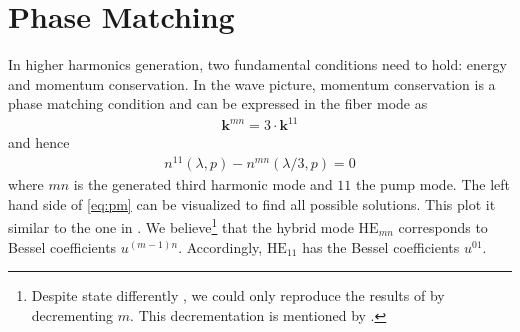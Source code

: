 \documentclass[fleqn, 10pt, twocolumn]{SelfArx}
\begin{document}
    \section{Phase Matching}
    In higher harmonics generation, two fundamental conditions need to hold: energy and momentum conservation. 
    In the wave picture, momentum conservation is a phase matching condition and can be expressed in the fiber mode as
    \begin{align}
        \mathbf{k}^{mn} = 3 \cdot \mathbf k^{11} 
    \end{align}
    and hence
    \begin{align}
        n^{11}(\lambda, p) - n^{mn}(\lambda / 3, p)= 0
        \label{eq:pm}
    \end{align}
    where $mn$ is the generated third harmonic mode and $11$ the pump mode. 
    The left hand side of \eqref{eq:pm} can be visualized to find all possible solutions. This plot it similar to the one in \cite{Nold2010}. 
    We believe\footnote{Despite \citeauthor{Travers2011} state differently \cite{Travers2011}, we could only reproduce the results of \citeauthor{Nold2010} by decrementing $m$. This decrementation is mentioned by \citeauthor{Marcatili1964} \cite{Marcatili1964}.} that the hybrid mode $\text{HE}_{mn}$ corresponds to Bessel coefficients $u^{(m-1)n}$. Accordingly, $\text{HE}_{11}$ has the Bessel coefficients $u^{01}$.
\end{document}
